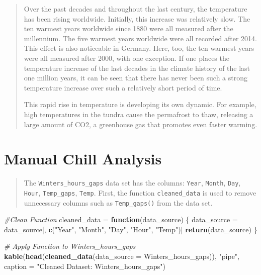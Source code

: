 \documentclass[
]{book}
\newenvironment{Shaded}{\begin{snugshade}}{\end{snugshade}}
\newcommand{\CommentTok}[1]{\textcolor[rgb]{0.56,0.35,0.01}{\textit{#1}}}
\newcommand{\ControlFlowTok}[1]{\textcolor[rgb]{0.13,0.29,0.53}{\textbf{#1}}}
\newcommand{\DataTypeTok}[1]{\textcolor[rgb]{0.13,0.29,0.53}{#1}}
\newcommand{\KeywordTok}[1]{\textcolor[rgb]{0.13,0.29,0.53}{\textbf{#1}}}
\newcommand{\NormalTok}[1]{#1}
\newcommand{\StringTok}[1]{\textcolor[rgb]{0.31,0.60,0.02}{#1}}
\begin{document}
\begin{quote}
Over the past decades and throughout the last century, the temperature has been rising worldwide. Initially, this increase was relatively slow. The ten warmest years worldwide since 1880 were all measured after the millennium. The five warmest years worldwide were all recorded after 2014. This effect is also noticeable in Germany. Here, too, the ten warmest years were all measured after 2000, with one exception. If one places the temperature increase of the last decades in the climate history of the last one million years, it can be seen that there has never been such a strong temperature increase over such a relatively short period of time.

This rapid rise in temperature is developing its own dynamic. For example, high temperatures in the tundra cause the permafrost to thaw, releasing a large amount of CO2, a greenhouse gas that promotes even faster warming.
\end{quote}

\hypertarget{manual-chill-analysis}{%
\chapter{Manual Chill Analysis}\label{manual-chill-analysis}}

\begin{quote}
The \texttt{Winters\_hours\_gaps} data set has the columns: \texttt{Year}, \texttt{Month}, \texttt{Day}, \texttt{Hour}, \texttt{Temp\_gaps}, \texttt{Temp}. First, the function \texttt{cleaned\_data} is used to remove unnecessary columns such as \texttt{Temp\_gaps()} from the data set.
\end{quote}

\begin{Shaded}
\begin{Highlighting}[]
\CommentTok{#Clean Function}
\NormalTok{cleaned_data =}\StringTok{ }\ControlFlowTok{function}\NormalTok{(data_source) \{}
\NormalTok{  data_source =}\StringTok{ }
\StringTok{    }\NormalTok{data_source[, }\KeywordTok{c}\NormalTok{(}\StringTok{"Year"}\NormalTok{, }\StringTok{"Month"}\NormalTok{, }\StringTok{"Day"}\NormalTok{, }\StringTok{"Hour"}\NormalTok{, }\StringTok{"Temp"}\NormalTok{)]}
  \KeywordTok{return}\NormalTok{(data_source)}
\NormalTok{\}}

\CommentTok{# Apply Function to Winters_hours_gaps}
\KeywordTok{kable}\NormalTok{(}\KeywordTok{head}\NormalTok{(}\KeywordTok{cleaned_data}\NormalTok{(}\DataTypeTok{data_source =}\NormalTok{ Winters_hours_gaps)), }
      \StringTok{"pipe"}\NormalTok{, }\DataTypeTok{caption =} \StringTok{"Cleaned  Dataset: Winters_hours_gaps"}\NormalTok{)}
\end{Highlighting}
\end{Shaded}
\end{document}
